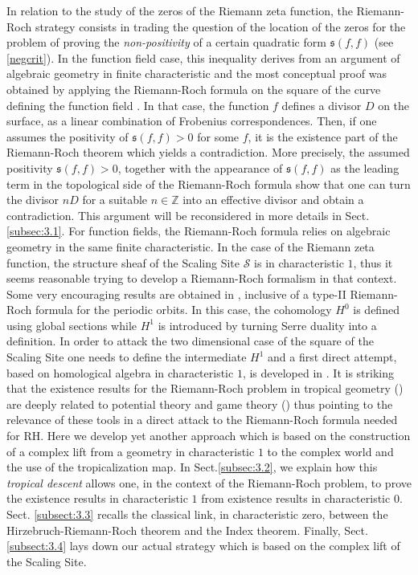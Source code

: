\documentclass[graybox, envcountsect%
]{svmult}
\def\inter{{\mathfrak s}}
\def\N{{\mathbb N}}
\def\Z{{\mathbb Z}}
\def\aarith{{\mathfrak A}}
\def\cO{{\mathcal O}}
\def\scal{{(\rnt,\cO)}}
\def\rnt{{[0,\infty)\rtimes{\N^{\times}}}}
\def\aarith{{\mathscr A}}
\def\scal{{(\rnt,\cO)}}
\def\scal1{{\hat \aarith}}
\def\scal2{{\mathscr S}}
\begin{document}
In relation to the study of the zeros of the Riemann zeta function, the Riemann-Roch strategy consists in trading the question of the location of the zeros  for the problem of proving the \emph{non-positivity}  of a certain quadratic form $\inter(f,f)$ (see \eqref{negcrit}). In the function field case, this inequality derives from an argument of  algebraic geometry in finite characteristic and the most conceptual proof was obtained by applying the Riemann-Roch formula on the square of the curve defining the function field \cite{grmt}.  In that case, the  function $f$ defines a divisor $D$ on the surface, as a linear combination of Frobenius correspondences. Then, if one assumes the positivity of  $\inter(f,f)>0$ for some $f$, it is the existence part of the Riemann-Roch theorem which yields a contradiction. More precisely, the assumed positivity  $\inter(f,f)>0$, together with the appearance of $\inter(f,f)$ as the leading term in the topological side of the Riemann-Roch formula show that one can turn the divisor $nD$ for a suitable $n\in \Z$ into an effective divisor and obtain a contradiction. This argument will be reconsidered  in more details in Sect. \ref{subsec:3.1}.  For function fields, the Riemann-Roch formula relies on algebraic geometry  in the same finite characteristic. In the case of the Riemann zeta function, the structure sheaf of the Scaling Site $\scal2$ is in characteristic $1$, thus it seems reasonable trying to develop a Riemann-Roch formalism in that context. Some very encouraging results are obtained in \cite{CC4}, inclusive of a type-II Riemann-Roch formula for the periodic orbits. In this case, the cohomology $H^0$ is defined using global sections while $H^1$ is introduced by turning Serre duality into a definition.   In order to attack the two dimensional case of the square of the Scaling Site one needs to define the intermediate $H^1$ and a first direct attempt,  based on homological algebra in characteristic $1$, is developed in \cite{CC5}. It is  striking that the  existence results for the Riemann-Roch problem in tropical geometry (\cite{BN,gathmannrr,MZ}) are deeply related to potential theory and game theory (\cite{BS,Shor}) thus pointing to the relevance of these tools in a direct attack to the  Riemann-Roch formula needed for RH. Here we develop yet another approach which is based on the construction of a complex lift from a geometry in characteristic $1$ to the complex world and the use of the tropicalization map. In Sect.\ref{subsec:3.2}, we explain how this {\em tropical descent} allows one, in the context of the Riemann-Roch problem, to prove the existence results in characteristic $1$ from existence results in characteristic $0$. Sect. \ref{subsect:3.3} recalls the classical link, in characteristic zero, between the Hirzebruch-Riemann-Roch theorem and the Index theorem. Finally, Sect. \ref{subsect:3.4} lays down our actual strategy which is based on the complex lift of the Scaling Site.
\end{document}
